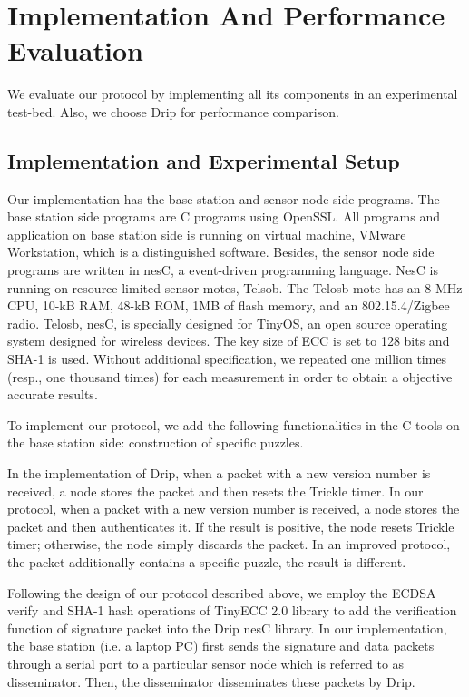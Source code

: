 \documentclass{sig-alternate-05-2015}
\begin{document}
\section{Implementation And Performance Evaluation}
We evaluate our protocol by implementing all its components in an experimental test-bed. Also, we choose Drip for performance comparison.

\subsection{Implementation and Experimental Setup}
Our implementation has the base station and sensor node side programs. The base station side programs are C programs using OpenSSL. All programs and application on base station side is running on virtual machine, VMware Workstation, which is a distinguished software. Besides, the sensor node side programs are written in nesC, a event-driven programming language. NesC is running on resource-limited  sensor motes, Telsob. The Telosb mote has an 8-MHz CPU, 10-kB RAM, 48-kB ROM, 1MB of flash memory, and an 802.15.4/Zigbee radio. Telosb, nesC, is specially designed for TinyOS, an open source operating system designed for wireless devices. 
The key size of ECC is set to 128 bits and SHA-1 is used. Without additional specification,
we repeated one million times (resp., one thousand times) for each measurement in order to obtain a objective accurate results.

To implement our protocol, we add the following functionalities in the C tools on the base station side: construction of specific puzzles. 

In the implementation of Drip, when a packet with a new version number is received, a node stores the packet and then resets the Trickle timer. In our protocol, when a packet with a new version number is received, a node stores the packet and then authenticates it. If the result is positive, the node resets Trickle timer; otherwise, the node simply discards the packet. In  an improved protocol, the packet additionally contains a specific puzzle, the result is different.

Following the design of our protocol described above, we employ the ECDSA verify and SHA-1 hash operations of TinyECC 2.0 library to add the verification function of signature packet into the Drip nesC library. 
In our implementation, the base station (i.e. a laptop PC) first sends the signature and data packets through a serial port to a particular sensor node which is referred to as disseminator. Then, the disseminator disseminates these packets by Drip.
\end{document}
